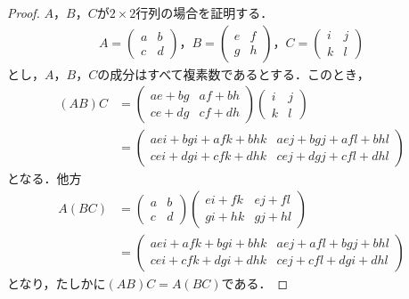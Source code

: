 \documentclass[a4paper,10pt,fleqn]{ltjsarticle}
\begin{document}
\begin{tleftbar}
  \begin{proof}
    $A$，$B$，$C$が$2 \times 2$行列の場合を証明する．
    \begin{gather*}
      A=
      \begin{pmatrix}
        a & b \\
        c & d
      \end{pmatrix}
      ，
      B=
      \begin{pmatrix}
        e & f \\
        g & h
      \end{pmatrix}
      ，C=
      \begin{pmatrix}
        i & j \\
        k & l
      \end{pmatrix}
    \end{gather*}
    とし，$A$，$B$，$C$の成分はすべて複素数であるとする．このとき，
    \begin{align*}
      (AB)C & =
      \begin{pmatrix}
        ae+bg & af+bh \\
        ce+dg & cf+dh
      \end{pmatrix}
      \begin{pmatrix}
        i & j \\
        k & l
      \end{pmatrix}
      \\
            & =
      \begin{pmatrix}
        aei +bgi +afk +bhk & aej+bgj+afl+bhl     \\
        cei +dgi+cfk +dhk  & cej +dgj + cfl +dhl
      \end{pmatrix}
    \end{align*}
    となる．他方
    \begin{align*}
      A(BC) & =
      \begin{pmatrix}
        a & b \\
        c & d
      \end{pmatrix}
      \begin{pmatrix}
        ei + fk & ej +fl \\
        gi + hk & gj +hl
      \end{pmatrix}
      \\
            & =
      \begin{pmatrix}
        aei + afk +bgi +bhk  & aej +afl +bgj +bhl   \\
        cei + cfk + dgi +dhk & cej + cfl + dgi +dhl
      \end{pmatrix}
    \end{align*}
    となり，たしかに$(AB)C=A(BC)$である．
  \end{proof}
\end{tleftbar}
%
\newpage
\end{document}
